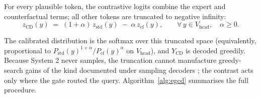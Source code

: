 \documentclass[pdflatex,sn-basic,Numbered]{sn-jnl}
\theoremstyle{thmstyleone}
\theoremstyle{thmstyletwo}
\theoremstyle{thmstylethree}
\begin{document}
For every plausible token, the contrastive logits combine the expert and counterfactual terms; all other tokens are truncated to negative infinity:
\begin{equation}\label{eq:cd}
z_{\text{CD}}(y) \;=\; (1 + \alpha)\, z_{\text{std}}(y) \;-\; \alpha\, z_{\text{cf}}(y), \qquad \forall\, y \in V_{\text{head}}, \quad \alpha \geq 0.
\end{equation}

The calibrated distribution is the softmax over this truncated space (equivalently, proportional to $P_{\text{std}}(y)^{1+\alpha} / P_{\text{cf}}(y)^{\alpha}$ on $V_{\text{head}}$), and $Y_{\text{CD}}$ is decoded greedily. Because System 2 never samples, the truncation cannot manufacture greedy-search gains of the kind documented under sampling decoders \cite{yin2025mirage,bendre2026rethinking}; the contrast acts only where the gate routed the query. Algorithm~\ref{alg:egcd} summarises the full procedure.
\end{document}
